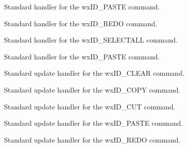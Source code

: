 Standard handler for the wxID\_PASTE command.

\label{wxrichtextctrlonredo}


Standard handler for the wxID\_REDO command.

\label{wxrichtextctrlonselectall}


Standard handler for the wxID\_SELECTALL command.

\label{wxrichtextctrlonundo}


Standard handler for the wxID\_PASTE command.

\label{wxrichtextctrlonupdateclear}


Standard update handler for the wxID\_CLEAR command.

\label{wxrichtextctrlonupdatecopy}


Standard update handler for the wxID\_COPY command.

\label{wxrichtextctrlonupdatecut}


Standard update handler for the wxID\_CUT command.

\label{wxrichtextctrlonupdatepaste}


Standard update handler for the wxID\_PASTE command.

\label{wxrichtextctrlonupdateredo}


Standard update handler for the wxID\_REDO command.

\label{wxrichtextctrlonupdateselectall}

